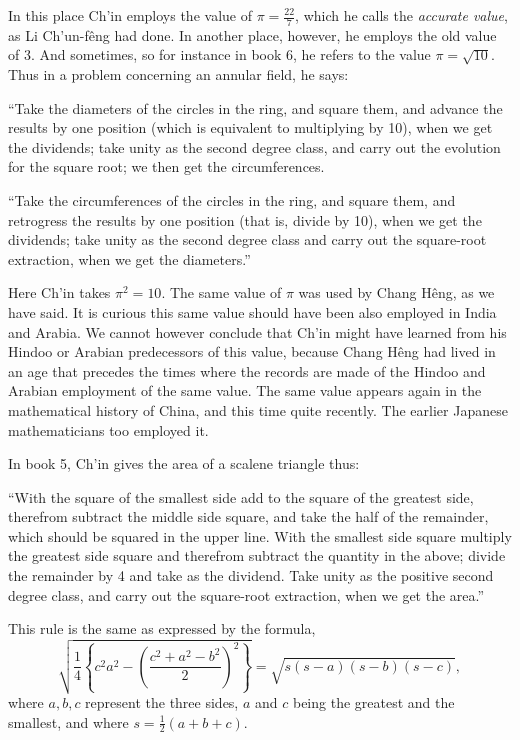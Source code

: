 \documentclass[11pt]{article}
\newcommand{\scanpage}[2]{\clearpage\setcounter{footnote}{0}\noindent{\footnotesize\color{gray}PDF page #1 · #2}\par\medskip}
\newcommand{\scanfooter}{}
\begin{document}
\scanpage{0084}{Chapter 11, printed page 70}
In this place Ch'in employs the value of $\pi=\frac{22}{7}$, which he calls the \emph{accurate value}, as Li Ch'un-fêng had done. In another place, however, he employs the old value of 3. And sometimes, so for instance in book 6, he refers to the value $\pi=\sqrt{10}$. Thus in a problem concerning an annular field, he says:

``Take the diameters of the circles in the ring, and square them, and advance the results by one position (which is equivalent to multiplying by 10), when we get the dividends; take unity as the second degree class, and carry out the evolution for the square root; we then get the circumferences.

``Take the circumferences of the circles in the ring, and square them, and retrogress the results by one position (that is, divide by 10), when we get the dividends; take unity as the second degree class and carry out the square-root extraction, when we get the diameters.''

Here Ch'in takes $\pi^2=10$. The same value of $\pi$ was used by Chang Hêng, as we have said. It is curious this same value should have been also employed in India and Arabia. We cannot however conclude that Ch'in might have learned from his Hindoo or Arabian predecessors of this value, because Chang Hêng had lived in an age that precedes the times where the records are made of the Hindoo and Arabian employment of the same value. The same value appears again in the mathematical history of China, and this time quite recently. The earlier Japanese mathematicians too employed it.

In book 5, Ch'in gives the area of a scalene triangle thus:

``With the square of the smallest side add to the square of the greatest side, therefrom subtract the middle side square, and take the half of the remainder, which should be squared in the upper line. With the smallest side square multiply the greatest side square and therefrom subtract the quantity in the above; divide the remainder by 4 and take as the dividend. Take unity as the positive second degree class, and carry out the square-root extraction, when we get the area.''

This rule is the same as expressed by the formula,
\[
\sqrt{\frac14\left\{c^2a^2-\left(\frac{c^2+a^2-b^2}{2}\right)^2\right\}}
=\sqrt{s(s-a)(s-b)(s-c)},
\]
where $a,b,c$ represent the three sides, $a$ and $c$ being the greatest and the smallest, and where $s=\frac12(a+b+c)$.
\scanfooter
\end{document}
